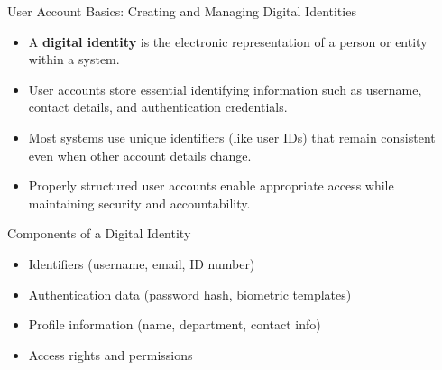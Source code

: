 \documentclass{beamer}
\begin{document}
\begin{frame}{User Account Basics: Creating and Managing Digital Identities}
    \begin{itemize}
        \item A \textbf{digital identity} is the electronic representation of a person or entity within a system.
        \item User accounts store essential identifying information such as username, contact details, and authentication credentials.
        \item Most systems use unique identifiers (like user IDs) that remain consistent even when other account details change.
        \item Properly structured user accounts enable appropriate access while maintaining security and accountability.
    \end{itemize}
    
    \begin{block}{Components of a Digital Identity}
        \begin{itemize}
            \item Identifiers (username, email, ID number)
            \item Authentication data (password hash, biometric templates)
            \item Profile information (name, department, contact info)
            \item Access rights and permissions
        \end{itemize}
    \end{block}
\end{frame}
\end{document}
